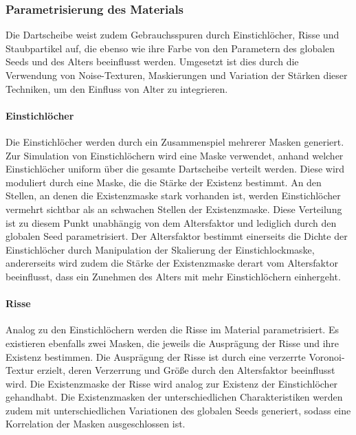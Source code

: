 \subsubsection{Parametrisierung des Materials}

Die Dartscheibe weist zudem Gebrauchsspuren durch Einstichlöcher, Risse und Staubpartikel auf, die ebenso wie ihre Farbe von den Parametern des globalen Seeds und des Alters beeinflusst werden. Umgesetzt ist dies durch die Verwendung von Noise-Texturen, Maskierungen und Variation der Stärken dieser Techniken, um den Einfluss von Alter zu integrieren.

\paragraph{Einstichlöcher}

Die Einstichlöcher werden durch ein Zusammenspiel mehrerer Masken generiert. Zur Simulation von Einstichlöchern wird eine Maske verwendet, anhand welcher Einstichlöcher uniform über die gesamte Dartscheibe verteilt werden. Diese wird moduliert durch eine Maske, die die Stärke der Existenz bestimmt. An den Stellen, an denen die Existenzmaske stark vorhanden ist, werden Einstichlöcher vermehrt sichtbar als an schwachen Stellen der Existenzmaske. Diese Verteilung ist zu diesem Punkt unabhängig von dem Altersfaktor und lediglich durch den globalen Seed parametrisiert. Der Altersfaktor bestimmt einerseits die Dichte der Einstichlöcher durch Manipulation der Skalierung der Einstichlockmaske, andererseits wird zudem die Stärke der Existenzmaske derart vom Altersfaktor beeinflusst, dass ein Zunehmen des Alters mit mehr Einstichlöchern einhergeht.

\paragraph{Risse}

Analog zu den Einstichlöchern werden die Risse im Material parametrisiert. Es existieren ebenfalls zwei Masken, die jeweils die Ausprägung der Risse und ihre Existenz bestimmen. Die Ausprägung der Risse ist durch eine verzerrte Voronoi-Textur erzielt, deren Verzerrung und Größe durch den Altersfaktor beeinflusst wird. Die Existenzmaske der Risse wird analog zur Existenz der Einstichlöcher gehandhabt. Die Existenzmasken der unterschiedlichen Charakteristiken werden zudem mit unterschiedlichen Variationen des globalen Seeds generiert, sodass eine Korrelation der Masken ausgeschlossen ist.

